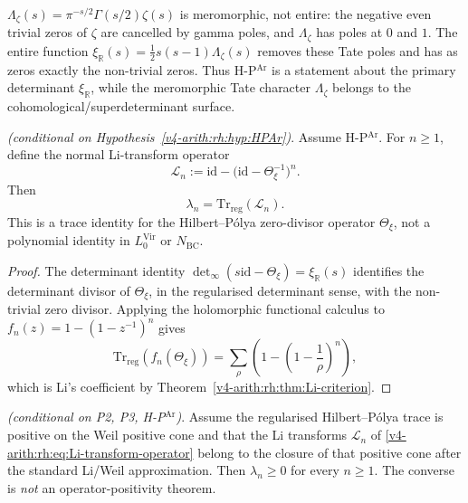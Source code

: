 \begin{remark}
\label{v4-arith:rh:rem:trivial-zero}
\(\Lambda_{\zeta}(s)=\pi^{-s/2}\Gamma(s/2)\zeta(s)\) is meromorphic,
not entire: the negative even trivial zeros of \(\zeta\) are cancelled
by gamma poles, and \(\Lambda_{\zeta}\) has poles at \(0\) and \(1\).
The entire function
\(\xi_{\mathbb R}(s)=\frac12s(s-1)\Lambda_{\zeta}(s)\) removes these
Tate poles and has as zeros exactly the non-trivial zeros. Thus
H-P\(^{\mathrm{Ar}}\) is a statement about the primary determinant
\(\xi_{\mathbb R}\), while the meromorphic Tate character
\(\Lambda_{\zeta}\) belongs to the cohomological/superdeterminant
surface.
\end{remark}

\begin{proposition}[Li coefficient = Hilbert--P\'olya transform trace]
\label{v4-arith:rh:prop:Li-is-Virasoro}
\ClaimStatusProvedHere \emph{(conditional on
Hypothesis~\ref{v4-arith:rh:hyp:HPAr})}.
Assume H-P\(^{\mathrm{Ar}}\). For \(n\geq1\), define the normal
Li-transform operator
\begin{equation}
\label{v4-arith:rh:eq:Li-transform-operator}
\mathcal L_{n}:=\mathrm{id}-\bigl(\mathrm{id}-\Theta_{\xi}^{-1}\bigr)^{n}.
\end{equation}
Then
\begin{equation}
\label{v4-arith:rh:eq:Li-transform-trace}
\lambda_{n}=\mathrm{Tr}_{\mathrm{reg}}(\mathcal L_{n}).
\end{equation}
This is a trace identity for the Hilbert--P\'olya zero-divisor operator
\(\Theta_{\xi}\), not a polynomial identity in
\(L_{0}^{\mathrm{Vir}}\) or \(N_{\mathrm{BC}}\).
\end{proposition}

\begin{proof}
The determinant identity
\(\det_{\infty}(s\mathrm{id}-\Theta_{\xi})=\xi_{\mathbb R}(s)\)
identifies the determinant divisor of \(\Theta_{\xi}\), in the
regularised determinant sense, with the non-trivial zero divisor.
Applying the holomorphic functional calculus to
\(f_{n}(z)=1-(1-z^{-1})^{n}\) gives
\[
\mathrm{Tr}_{\mathrm{reg}}(f_{n}(\Theta_{\xi}))
=\sum_{\rho}\left(1-\left(1-\frac1{\rho}\right)^{n}\right),
\]
which is Li's coefficient by Theorem~\ref{v4-arith:rh:thm:Li-criterion}.
\end{proof}

\begin{corollary}
\label{v4-arith:rh:cor:VB-implies-Li}
\ClaimStatusProvedHere \emph{(conditional on P2, P3, H-P\(^{\mathrm{Ar}}\))}.
Assume the regularised Hilbert--P\'olya trace is positive on the
Weil positive cone and that the Li transforms
\(\mathcal L_{n}\) of \eqref{v4-arith:rh:eq:Li-transform-operator}
belong to the closure of that positive cone after the standard
Li/Weil approximation. Then \(\lambda_{n}\geq0\) for every
\(n\geq1\). The converse is \emph{not} an operator-positivity theorem.
\end{corollary}

